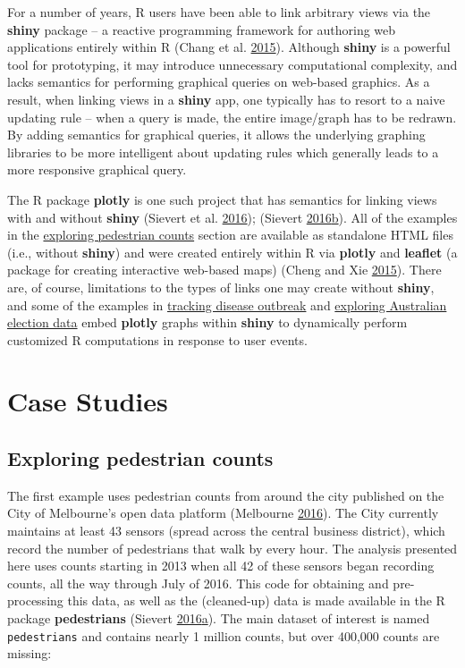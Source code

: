 \documentclass[12pt,]{isuthesis}
\begin{document}
For a number of years, R users have been able to link arbitrary views
via the \textbf{shiny} package -- a reactive programming framework for
authoring web applications entirely within R (Chang et al.
\protect\hyperlink{ref-shiny}{2015}). Although \textbf{shiny} is a
powerful tool for prototyping, it may introduce unnecessary
computational complexity, and lacks semantics for performing graphical
queries on web-based graphics. As a result, when linking views in a
\textbf{shiny} app, one typically has to resort to a naive updating rule
-- when a query is made, the entire image/graph has to be redrawn. By
adding semantics for graphical queries, it allows the underlying
graphing libraries to be more intelligent about updating rules which
generally leads to a more responsive graphical query.

The R package \textbf{plotly} is one such project that has semantics for
linking views with and without \textbf{shiny} (Sievert et al.
\protect\hyperlink{ref-plotly}{2016}); (Sievert
\protect\hyperlink{ref-plotly-book}{2016}\protect\hyperlink{ref-plotly-book}{b}).
All of the examples in the
\protect\hyperlink{exploring-pedestrian-counts}{exploring pedestrian
counts} section are available as standalone HTML files (i.e., without
\textbf{shiny}) and were created entirely within R via \textbf{plotly}
and \textbf{leaflet} (a package for creating interactive web-based maps)
(Cheng and Xie \protect\hyperlink{ref-leaflet}{2015}). There are, of
course, limitations to the types of links one may create without
\textbf{shiny}, and some of the examples in
\protect\hyperlink{Tracking-disease-outbreak}{tracking disease outbreak}
and \protect\hyperlink{exploring-australian-election-data}{exploring
Australian election data} embed \textbf{plotly} graphs within
\textbf{shiny} to dynamically perform customized R computations in
response to user events.

\section{Case Studies}\label{case-studies}

\hypertarget{exploring-pedestrian-counts}{\subsection{Exploring
pedestrian counts}\label{exploring-pedestrian-counts}}

The first example uses pedestrian counts from around the city published
on the City of Melbourne's open data platform (Melbourne
\protect\hyperlink{ref-melbourne}{2016}). The City currently maintains
at least 43 sensors (spread across the central business district), which
record the number of pedestrians that walk by every hour. The analysis
presented here uses counts starting in 2013 when all 42 of these sensors
began recording counts, all the way through July of 2016. This code for
obtaining and pre-processing this data, as well as the (cleaned-up) data
is made available in the R package \textbf{pedestrians} (Sievert
\protect\hyperlink{ref-pedestrians}{2016}\protect\hyperlink{ref-pedestrians}{a}).
The main dataset of interest is named \texttt{pedestrians} and contains
nearly 1 million counts, but over 400,000 counts are missing:
\end{document}
